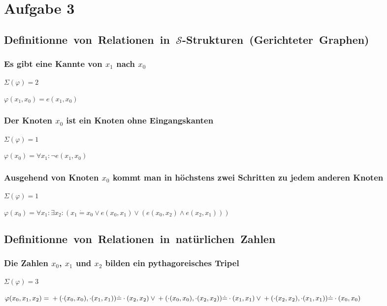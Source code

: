 \section*{Aufgabe 3}

\subsection*{\mbox{Definitionne von Relationen in $\mathcal{S}$-Strukturen (Gerichteter Graphen)}}

\subsubsection*{Es gibt eine Kannte von $x_1$ nach $x_0$}
 
$\Sigma(\varphi) = 2$

$\varphi(x_1,x_0) = e(x_1,x_0)$

\subsubsection*{Der Knoten $x_0$ ist ein Knoten ohne Eingangskanten}
$\Sigma(\varphi) = 1$

$\varphi(x_0) = \forall x_1: \neg e(x_1,x_0)$

\subsubsection*{Ausgehend von Knoten $x_0$ kommt man in höchstens zwei Schritten zu jedem anderen Knoten}
$\Sigma(\varphi) = 1$

$\varphi(x_0) = \forall x_1: \exists x_2: (x_1 \dot{=} x_0 \vee e(x_0,x_1) \vee (e(x_0,x_2) \wedge e(x_2,x_1)))$

\subsection*{\mbox{Definitionne von Relationen in natürlichen Zahlen}}

\subsubsection*{Die Zahlen $x_0$, $x_1$ und $x_2$ bilden ein pythagoreisches Tripel}
$\Sigma(\varphi) = 3$

$\varphi(x_0,x_1,x_2) = \\
+(\cdot(x_0,x_0),\cdot(x_1,x_1)) \dot{=} \cdot(x_2,x_2) \vee \\
+(\cdot(x_0,x_0),\cdot(x_2,x_2)) \dot{=} \cdot(x_1,x_1) \vee \\
+(\cdot(x_2,x_2),\cdot(x_1,x_1)) \dot{=} \cdot(x_0,x_0)	
$

